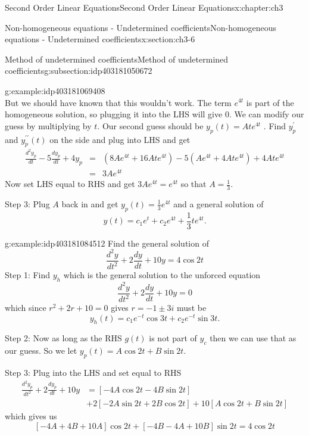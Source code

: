 \documentclass[oneside,10pt,]{book}
\numberwithin{equation}{section}
\numberwithin{equation}{section}
\newcommand{\amp}{&}
\begin{document}
\begin{chapterptx}{Second Order Linear Equations}{}{Second Order Linear Equations}{}{}{x:chapter:ch3}
\begin{sectionptx}{Non-homogeneous equations - Undetermined coefficients}{}{Non-homogeneous equations - Undetermined coefficients}{}{}{x:section:ch3-6}
\begin{subsectionptx}{Method of undetermined coefficients}{}{Method of undetermined coefficients}{}{}{g:subsection:idp403181050672}
\begin{example}{}{g:example:idp403181069408}
\begin{equation*}
\end{equation*}
But we should have known that this wouldn't work. The term \(e^{4t}\) is part of the homogeneous solution, so plugging it into the LHS will give 0. We can modify our guess by multiplying by \(t\). Our second guess should be \(y_{p}(t)=Ate^{4t}\) . Find \(y_{p}^{\prime}\) and \(y_{p}^{\prime\prime}(t)\) on the side and plug into LHS and get%
\begin{align*}
\frac{d^{2}y_{p}}{dt}-5\frac{dy_{p}}{dt}+4y_{p} \amp = \amp \left(8Ae^{4t}+16Ate^{4t}\right)-5\left(Ae^{4t}+4Ate^{4t}\right)+4Ate^{4t}\\
\amp = \amp 3Ae^{4t}
\end{align*}
Now set LHS equal to RHS and get \(3Ae^{4t}=e^{4t}\) so that \(A=\frac{1}{3}\).%
\par
Step 3: Plug \(A\) back in and get \(y_{p}(t)=\frac{1}{3}e^{4t}\) and a general solution of%
\begin{equation*}
y(t)=c_{1}e^{t}+c_{2}e^{4t}+\frac{1}{3}te^{4t}.
\end{equation*}
%
\end{example}
\begin{example}{}{g:example:idp403181084512}%
Find the general solution of%
\begin{equation*}
\frac{d^{2}y}{dt^{2}}+2\frac{dy}{dt}+10y=4\cos2t
\end{equation*}
Step 1: Find \(y_{h}\) which is the general solution to the unforced equation%
\begin{equation*}
\frac{d^{2}y}{dt^{2}}+2\frac{dy}{dt}+10y=0
\end{equation*}
which since \(r^{2}+2r+10=0\) gives \(r=-1\pm3i\) must be%
\begin{equation*}
y_{h}(t)=c_{1}e^{-t}\cos3t+c_{2}e^{-t}\sin3t.
\end{equation*}
%
\par
Step 2: Now as long as the RHS \(g(t)\) is not part of \(y_{c}\) then we can use that as our guess. So we let \(y_{p}(t)=A\cos2t+B\sin2t\).%
\par
Step 3: Plug into the LHS and set equal to RHS%
\begin{align*}
\frac{d^{2}y_{p}}{dt^{2}}+2\frac{dy_{p}}{dt}+10y \amp = \left[-4A\cos2t-4B\sin2t\right]\\
\amp +2\left[-2A\sin2t+2B\cos2t\right]+10\left[A\cos2t+B\sin2t\right]
\end{align*}
which gives us%
\begin{equation*}
\left[-4A+4B+10A\right]\cos2t+\left[-4B-4A+10B\right]\sin2t=4\cos2t

\end{equation*}
\end{example}
\end{subsectionptx}
\end{sectionptx}
\end{chapterptx}
\end{document}
